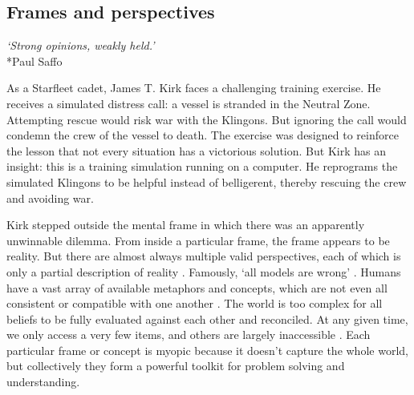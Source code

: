 \documentclass[12pt]{article}
\begin{document}
\subsection{Frames and perspectives} 

\begin{center}
\textit{`Strong opinions, weakly held.'}\\*Paul Saffo
\end{center}

As a Starfleet cadet, James T. Kirk faces a challenging training exercise. He receives a simulated distress call: a vessel is stranded in the Neutral Zone. Attempting rescue would risk war with the Klingons. But ignoring the call would condemn the crew of the vessel to death. The exercise was designed to reinforce the lesson that not every situation has a victorious solution. But Kirk has an insight: this is a training simulation running on a computer. He reprograms the simulated Klingons to be helpful instead of belligerent, thereby rescuing the crew and avoiding war. 

Kirk stepped outside the mental frame in which there was an apparently unwinnable dilemma. From inside a particular frame, the frame appears to be reality. But there are almost always multiple valid perspectives, each of which is only a partial description of reality \citep{goffman1974frame, de1970lateral, duncker1945on, ohlsson1992information, lakoff1980metaphors, safo2008strong, javed2024big, popper1934logik, korzybski1933science, wittgenstein1922tractatus, heidegger1998humanism, kuhn1970structure}. Famously, `all models are wrong' \citep{box1976science}. Humans have a vast array of available metaphors and concepts, which are not even all consistent or compatible with one another \citep{feyerabend1975against, hofstadter2001analogy, wood2012dead, freud1936ich, adorno1950authoritarian}. The world is too complex for all beliefs to be fully evaluated against each other and reconciled. At any given time, we only access a very few items, and others are largely inaccessible \citep{miller1956magical, hills2015exploration, baddeley2000episodic, dehaene2014consciousness}. Each particular frame or concept is myopic because it doesn't capture the whole world, but collectively they form a powerful toolkit for problem solving and understanding. 
\end{document}
